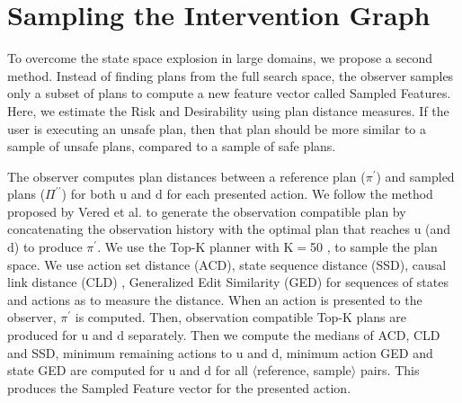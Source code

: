 \documentclass[letterpaper]{article}
\theoremstyle{plain}
\begin{document}
\section{Sampling the Intervention Graph}
To overcome the state space explosion in large domains, we propose a second method. Instead of finding plans from the full search space, the observer samples only a subset of plans to compute a new feature vector called Sampled Features. Here, we estimate the Risk and Desirability using plan distance measures. If the user is executing an unsafe plan, then that plan should be more similar to a sample of unsafe plans, compared to a sample of safe plans. 

The observer computes plan distances between a reference plan ($\pi^\prime$) and sampled plans ($\Pi^{\prime\prime}$) for both $\mathrm{u}$ and $\mathrm{d}$ for each presented action. 
 We follow the method proposed by Vered et al.  to generate the observation compatible plan by concatenating the observation history with the optimal plan that reaches $\mathrm{u}$ (and $\mathrm{d}$) to produce $\pi^\prime$. 
 We use the Top-K planner with K$=$50 \cite{riabov2014}, to sample the plan space.
We use action set distance (ACD), state sequence distance (SSD), causal link distance (CLD) \cite{nguyen2012generating}, Generalized Edit Similarity (GED) for sequences of states and actions \cite{sohrabi2016finding} as to measure the distance. When an action is presented to the observer, $\pi^\prime$ is computed. Then, observation compatible Top-K plans are produced for $\mathrm{u}$ and $\mathrm{d}$ separately. Then we compute the medians of ACD, CLD and SSD, minimum remaining actions to $\mathrm{u}$ and $\mathrm{d}$, minimum action GED and state GED are computed for $\mathrm{u}$ and $\mathrm{d}$ for all $\langle$reference, sample$\rangle$ pairs. This produces the Sampled Feature vector for the presented action.
\end{document}
